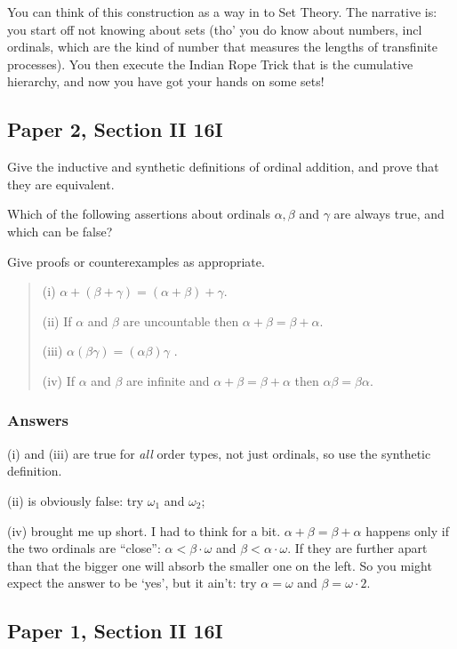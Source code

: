 \documentclass{book}
\begin{document}
You can think of this construction as a way in to Set Theory.  The
narrative is: you start off not knowing about sets (tho' you do know
about numbers, incl ordinals, which are the kind of number that
measures the lengths of transfinite processes).  You then execute the
Indian Rope Trick that is the cumulative hierarchy, and now you have
got your hands on some sets!

\subsection*{Paper 2, Section II  16I}

Give the inductive and synthetic definitions of ordinal addition, and
prove that they are equivalent.

Which of the following assertions about ordinals $\alpha,\beta$ and
$\gamma$ are always true, and which can be false?

Give proofs or counterexamples as appropriate.
\begin{quote}
(i)  $\alpha+ (\beta+\gamma ) = (\alpha+\beta) +\gamma$.

(ii) If $\alpha$ and $\beta$ are uncountable then $\alpha+\beta=\beta+\alpha$.

(iii) $\alpha(\beta\gamma ) = (\alpha\beta)\gamma$ .

(iv) If $\alpha$ and $\beta$ are infinite and $\alpha+\beta=\beta+\alpha$
then $\alpha\beta=\beta\alpha$.
\end{quote}

\subsubsection*{Answers}

(i) and (iii) are true for {\sl all} order types, not just ordinals, so use the synthetic definition.

(ii)  is obviously false: try $\omega_1$ and $\omega_2$;

(iv) brought me up short.  I had to think for a bit.
$\alpha + \beta = \beta + \alpha$ happens only if the two ordinals are
``close'': $\alpha < \beta\cdot \omega$ and
$\beta < \alpha\cdot\omega$.  If they are further apart than that the
bigger one will absorb the smaller one on the left.  So you might
expect the answer to be `yes', but it ain't: try $\alpha = \omega$ and
$\beta = \omega\cdot 2$.

\subsection*{Paper 1, Section II 16I}
\end{document}
